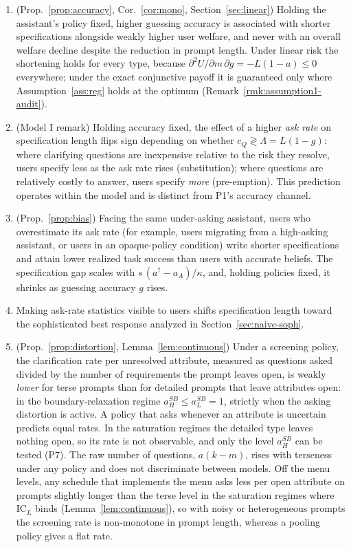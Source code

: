 \documentclass[11pt]{article}
\begin{document}
\begin{enumerate}[leftmargin=*]
\item[\textbf{P1}] (Prop.~\ref{prop:accuracy}, Cor.~\ref{cor:mono}, Section~\ref{sec:linear}) Holding the
assistant's policy fixed, higher guessing accuracy is associated with
shorter specifications alongside weakly higher user welfare, and never with
an overall welfare decline despite the reduction in prompt length. Under linear risk the shortening holds for every type, because $\partial^2 U/\partial m\,\partial g = -L(1-a) \le 0$ everywhere; under the exact conjunctive payoff it is guaranteed only where Assumption~\ref{ass:reg} holds at the optimum (Remark~\ref{rmk:assumption1-audit}).
\item[\textbf{P1$'$}] (Model I remark) Holding accuracy fixed, the effect of a
higher \emph{ask rate} on specification length flips sign depending on
whether $c_Q \gtrless \Lambda=L(1-g)$: where clarifying questions are inexpensive
relative to the risk they resolve, users specify less as the ask rate rises
(substitution); where questions are relatively costly to answer, users specify
\emph{more} (pre-emption). This prediction operates within the model and is distinct
from P1's accuracy channel.
\item[\textbf{P2}] (Prop.~\ref{prop:bias}) Facing the same under-asking assistant, users who
overestimate its ask rate (for example, users migrating from a high-asking assistant, or users
in an opaque-policy condition) write shorter specifications and attain lower realized task
success than users with accurate beliefs. The specification gap scales with
$s\,(a^\dagger - a_A)/\kappa$, and, holding policies fixed, it shrinks as guessing
accuracy $g$ rises.
\item[\textbf{P3}] Making ask-rate statistics visible to users shifts
specification length toward the sophisticated best response analyzed in
Section~\ref{sec:naive-soph}.
\item[\textbf{P4}] (Prop.~\ref{prop:distortion}, Lemma~\ref{lem:continuous}) Under a screening policy, the clarification rate per unresolved attribute, measured as questions asked divided by the number of requirements the prompt leaves open, is weakly \emph{lower} for terse prompts than for detailed prompts that leave attributes open: in the boundary-relaxation regime $a_H^{SB} \le a_L^{SB} = 1$, strictly when the asking distortion is active. A policy that asks whenever an attribute is uncertain predicts equal rates. In the saturation regimes the detailed type leaves nothing open, so its rate is not observable, and only the level $a_H^{SB}$ can be tested (P7). The raw number of questions, $a(k-m)$, rises with terseness under any policy and does not discriminate between models. Off the menu levels, any schedule that implements the menu asks less per open attribute on prompts slightly longer than the terse level in the saturation regimes where $\text{IC}_L$ binds (Lemma~\ref{lem:continuous}), so with noisy or heterogeneous prompts the screening rate is non-monotone in prompt length, whereas a pooling policy gives a flat rate.

\end{enumerate}
\end{document}
